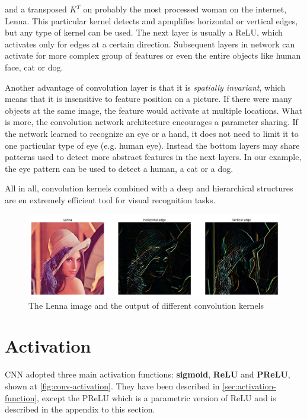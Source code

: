 and a transposed $K^T$ on probably the most processed woman on the internet, Lenna. This particular kernel detects and apmplifies horizontal or vertical edges, but any type of kernel can be used. The next layer is usually a ReLU, which activates only for edges at a certain direction. Subsequent layers in network can activate for more complex group of features or even the entire objects like human face, cat or dog. 

Another advantage of convolution layer is that it is \emph{spatially invariant}, which means that it is insensitive to feature position on a picture. If there were many objects at the same image, the feature would activate at multiple locations. What is more, the convolution network architecture encourages a parameter sharing. If the network learned to recognize an eye or a hand, it does not need to limit it to one particular type of eye (e.g. human eye). Instead the bottom layers may share patterns used to detect more abstract features in the next layers. In our example, the eye pattern can be used to detect a human, a cat or a dog.

All in all, convolution kernels combined with a deep and hierarchical structures are en extremely efficient tool for visual recognition tasks.

\begin{figure}[h]
    \centering
    \includegraphics[width=16cm]{img/Lenna1.png}
    \caption{The Lenna image and the output of different convolution kernels}
    \label{fig:conv-lenna}
\end{figure}

\section{Activation}
\label{sec:conv-activation}

CNN adopted three main activation functions: \textbf{sigmoid}, \textbf{ReLU} and \textbf{PReLU}, shown at \ref{fig:conv-activation}. They have been described in \ref{sec:activation-function}, except the PReLU which is a parametric version of ReLU and is described in the appendix to this section.

